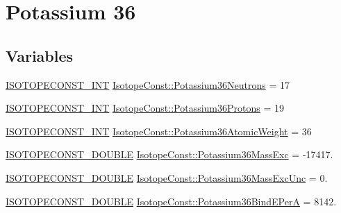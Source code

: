 \hypertarget{group___isotope_const-_potassium-_k36}{}\section{Potassium 36}
\label{group___isotope_const-_potassium-_k36}
\subsection*{Variables}
\begin{DoxyCompactItemize}
\item 
\mbox{\hyperlink{group___isotope_const-_macros_ga5f18360b3e99483a35c32d789e62621c}{I\+S\+O\+T\+O\+P\+E\+C\+O\+N\+S\+T\+\_\+\+I\+NT}} \mbox{\hyperlink{group___isotope_const-_potassium-_k36_ga4fc174c3c91608b0d5202606ac3df04b}{Isotope\+Const\+::\+Potassium36\+Neutrons}} = 17
\item 
\mbox{\hyperlink{group___isotope_const-_macros_ga5f18360b3e99483a35c32d789e62621c}{I\+S\+O\+T\+O\+P\+E\+C\+O\+N\+S\+T\+\_\+\+I\+NT}} \mbox{\hyperlink{group___isotope_const-_potassium-_k36_gafecb4fce7cc9ac2e2846ff29aef874d7}{Isotope\+Const\+::\+Potassium36\+Protons}} = 19
\item 
\mbox{\hyperlink{group___isotope_const-_macros_ga5f18360b3e99483a35c32d789e62621c}{I\+S\+O\+T\+O\+P\+E\+C\+O\+N\+S\+T\+\_\+\+I\+NT}} \mbox{\hyperlink{group___isotope_const-_potassium-_k36_ga09d084d5bf6ed1d031b5ac6755a612f7}{Isotope\+Const\+::\+Potassium36\+Atomic\+Weight}} = 36
\item 
\mbox{\hyperlink{group___isotope_const-_macros_ga8f45a7272ce02c0b4c65c44636ed719a}{I\+S\+O\+T\+O\+P\+E\+C\+O\+N\+S\+T\+\_\+\+D\+O\+U\+B\+LE}} \mbox{\hyperlink{group___isotope_const-_potassium-_k36_ga954f2d5c719336f7be4b4502c02e3fef}{Isotope\+Const\+::\+Potassium36\+Mass\+Exc}} = -\/17417.
\item 
\mbox{\hyperlink{group___isotope_const-_macros_ga8f45a7272ce02c0b4c65c44636ed719a}{I\+S\+O\+T\+O\+P\+E\+C\+O\+N\+S\+T\+\_\+\+D\+O\+U\+B\+LE}} \mbox{\hyperlink{group___isotope_const-_potassium-_k36_ga44c71b3b49248096b218b7c8b687b4e9}{Isotope\+Const\+::\+Potassium36\+Mass\+Exc\+Unc}} = 0.
\item 
\mbox{\hyperlink{group___isotope_const-_macros_ga8f45a7272ce02c0b4c65c44636ed719a}{I\+S\+O\+T\+O\+P\+E\+C\+O\+N\+S\+T\+\_\+\+D\+O\+U\+B\+LE}} \mbox{\hyperlink{group___isotope_const-_potassium-_k36_ga515b6c57b3488eaf734772552cd44711}{Isotope\+Const\+::\+Potassium36\+Bind\+E\+PerA}} = 8142.
\item 

\end{DoxyCompactItemize}
